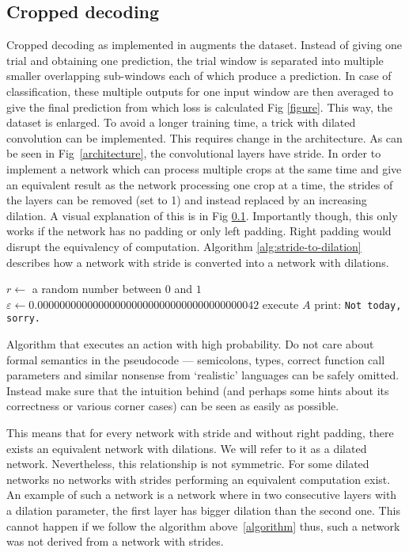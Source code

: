 \subsection{Cropped decoding}
Cropped decoding as implemented in \cite{Schirrmeister} augments the dataset.
Instead of giving one trial and obtaining one prediction, the trial window is separated into multiple smaller overlapping sub-windows each of which produce a prediction.
In case of classification, these multiple outputs for one input window are then averaged to give the final prediction from which loss is calculated Fig \ref{figure}.
This way, the dataset is enlarged.
To avoid a longer training time, a trick with dilated convolution can be implemented.
This requires change in the architecture. As can be seen in Fig~\ref{architecture}, the convolutional layers have stride.
In order to implement a network which can process multiple crops at the same time and give an equivalent result as the network processing one crop at a time, the strides of the layers can be removed (set to 1) and instead replaced by an increasing dilation.
A visual explanation of this is in Fig \ref{}.
Importantly though, this only works if the network has no padding or only left padding.
Right padding would disrupt the equivalency of computation.
Algorithm \ref{alg:stride-to-dilation} describes how a network with stride is converted into a network with dilations.\\
\begin{algorithm}
\begin{algorithmic}
	\State $r \gets$ a random number between $0$ and $1$
	\State $\varepsilon \gets 0.0000000000000000000000000000000000000042$
		\State execute $A$ 
	\Else
		\State print: \texttt{Not today, sorry.}
	\EndIf
\EndFunction
\end{algorithmic}
\caption{Algorithm that executes an action with high probability. Do not care about formal semantics in the pseudocode --- semicolons, types, correct function call parameters and similar nonsense from `realistic' languages can be safely omitted. Instead make sure that the intuition behind (and perhaps some hints about its correctness or various corner cases) can be seen as easily as possible.}
\label{alg:stride-to-dilation}
\end{algorithm}

This means that for every network with stride and without right padding, there exists an equivalent network with dilations.
We will refer to it as a dilated network.
Nevertheless, this relationship is not symmetric.
For some dilated networks no networks with strides performing an equivalent computation exist.
An example of such a network is a network where in two consecutive layers with a dilation parameter, the first layer has bigger dilation than the second one.
This cannot happen if we follow the algorithm above~\ref{algorithm} thus, such a network was not derived from a network with strides.

